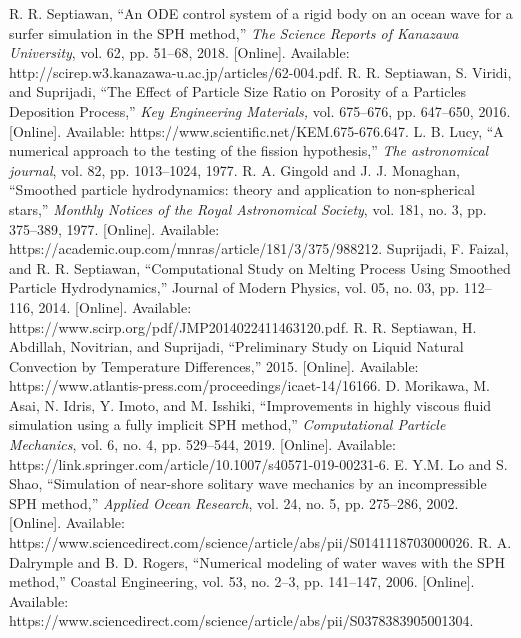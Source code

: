 \documentclass{article}
\begin{document}
\begin{thebibliography}{1.7} 
	 \color{cyan}R. R. Septiawan, “An ODE control system of a rigid body on an ocean wave for a surfer simulation in the SPH method,” \textit{The Science Reports of Kanazawa University}, vol. 62, pp. 51–68, 2018. [Online]. Available: http://scirep.w3.kanazawa-u.ac.jp/articles/62-004.pdf. \color{black}
	 \color{cyan}R. R. Septiawan, S. Viridi, and Suprijadi, “The Effect of Particle Size Ratio on Porosity of a Particles Deposition Process,” \textit{Key Engineering Materials,} vol. 675–676, pp. 647–650, 2016. [Online]. Available: https://www.scientific.net/KEM.675-676.647. \color{black}
	 \color{cyan}L. B. Lucy, “A numerical approach to the testing of the fission hypothesis,” \textit{The astronomical journal}, vol. 82, pp. 1013–1024, 1977. \color{black}
	 \color{cyan}R. A. Gingold and J. J. Monaghan, “Smoothed particle hydrodynamics: theory and application to non-spherical stars,” \textit{Monthly Notices of the Royal Astronomical Society}, vol. 181, no. 3, pp. 375–389, 1977. [Online]. Available:  https://academic.oup.com/mnras/article/181/3/375/988212. \color{black}
	 \color{cyan}Suprijadi, F. Faizal, and R. R. Septiawan, “Computational Study on Melting Process Using Smoothed Particle Hydrodynamics,” Journal of Modern Physics, vol. 05, no. 03, pp. 112–116, 2014. [Online]. Available: https://www.scirp.org/pdf/JMP2014022411463120.pdf.\color{black}
	 \color{cyan}R. R. Septiawan, H. Abdillah, Novitrian, and Suprijadi, “Preliminary Study on Liquid Natural Convection by Temperature Differences,” 2015. [Online]. Available: https://www.atlantis-press.com/proceedings/icaet-14/16166.\color{black}
	\color{cyan}D. Morikawa, M. Asai, N. Idris, Y. Imoto, and M. Isshiki, “Improvements in highly viscous fluid simulation using a fully implicit SPH method,” \textit{Computational Particle Mechanics}, vol. 6, no. 4, pp. 529–544, 2019. [Online]. Available: https://link.springer.com/article/10.1007/s40571-019-00231-6.\color{black}
	 \color{cyan}E. Y.M. Lo and S. Shao, “Simulation of near-shore solitary wave mechanics by an incompressible SPH method,” \textit{Applied Ocean Research}, vol. 24, no. 5, pp. 275–286, 2002. [Online]. Available: https://www.sciencedirect.com/science/article/abs/pii/S0141118703000026.\color{black}
	 \color{cyan}R. A. Dalrymple and B. D. Rogers, “Numerical modeling of water waves with the SPH method,” Coastal Engineering, vol. 53, no. 2–3, pp. 141–147, 2006. [Online]. Available: https://www.sciencedirect.com/science/article/abs/pii/S0378383905001304.\color{black}

\end{thebibliography}
\end{document}
